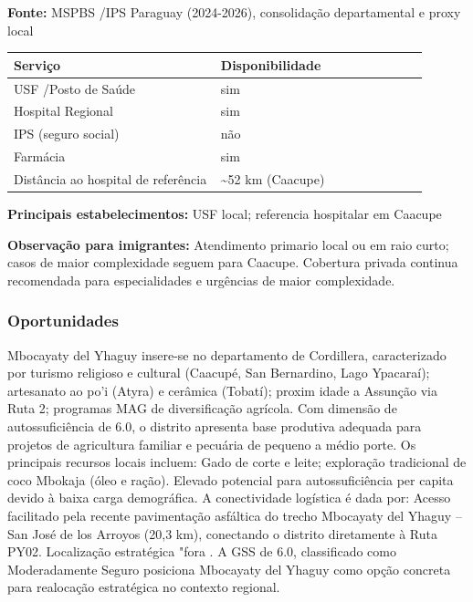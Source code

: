 \textbf{Fonte:} MSPBS /\allowbreak  IPS Paraguay (2024-2026), consolidação
departamental e proxy local

{\def\LTcaptype{none} %
\begin{longtable}{@{}>{\raggedright\arraybackslash}p{0.45\linewidth} >{\raggedright\arraybackslash}p{0.45\linewidth}@{}}
\toprule\noalign{}
Serviço & Disponibilidade \\
\midrule\noalign{}
\endhead
\bottomrule\noalign{}
\endlastfoot
USF /\allowbreak  Posto de Saúde & sim \\
Hospital Regional & sim \\
IPS (seguro social) & não \\
Farmácia & sim \\
Distância ao hospital de referência & \textasciitilde52 km (Caacupe) \\
\end{longtable}
}

\textbf{Principais estabelecimentos:} USF local; referencia hospitalar
em Caacupe

\textbf{Observação para imigrantes:} Atendimento primario local ou em
raio curto; casos de maior complexidade seguem para Caacupe. Cobertura
privada continua recomendada para especialidades e urgências de maior
complexidade.
\newpage

\subsubsection*{Oportunidades}\label{oport-mbocayaty-del-yhaguy-0312}
Mbocayaty del Yhaguy insere-se no departamento de Cordillera, caracterizado por turismo religioso e cultural (Caacupé, San Bernardino, Lago Ypacaraí); artesanato ao po'i (Atyra) e cerâmica (Tobatí); proxim idade a Assunção via Ruta 2; programas MAG de diversificação agrícola. Com dimensão de autossuficiência de 6.0, o distrito apresenta base produtiva adequada para projetos de agricultura familiar e pecuária de pequeno a médio porte. Os principais recursos locais incluem: Gado de corte e leite; exploração tradicional de coco Mbokaja (óleo e ração). Elevado potencial para autossuficiência per capita devido à baixa carga demográfica. A conectividade logística é dada por: Acesso facilitado pela recente pavimentação asfáltica do trecho Mbocayaty del Yhaguy -- San José de los Arroyos (20,3 km), conectando o distrito diretamente à Ruta PY02. Localização estratégica "fora . A GSS de 6.0, classificado como Moderadamente Seguro posiciona Mbocayaty del Yhaguy como opção concreta para realocação estratégica no contexto regional.

